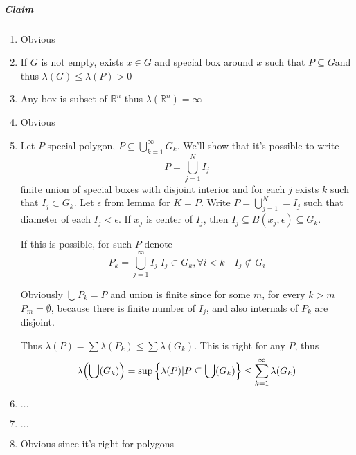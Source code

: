 \subparagraph{Claim}
\begin{enumerate}
	\item Obvious
	\item If $G$ is not empty, exists $x\in G$ and special box around $x$ such that $P\subseteq G$and thus $\lambda(G) \leq \lambda(P) > 0$
	\item Any box is subset of $\mathbb{R}^n$ thus $\lambda(\mathbb{R}^n) = \infty$
	\item Obvious
	\item Let $P$ special polygon, $P\subseteq \bigcup_{k=1}^\infty G_k$. We'll show that it's possible to write 
	$$P = \bigcup_{j=1}^N I_j$$
	finite union of special boxes with disjoint interior and for each $j$ exists $k$ such that $I_j \subset G_k$. Let $\epsilon$ from lemma for $K=P$. Write $P=\bigcup_{j=1}^N = I_j$ such that diameter of each $I_j<\epsilon$. If $x_j$ is center of $I_j$, then $I_j \subseteq B(x_j,\epsilon) \subseteq G_k$.
	
	If this is possible, for such $P$ denote $$P_k =  \bigcup_{j=1}^\infty I_j | I_j \subset G_k, \forall i<k \quad I_j \not\subset G_i$$
	
	Obviously $\bigcup P_k = P$ and union is finite since for some $m$, for every $k>m$ $P_m=\emptyset$, because there is finite number of $I_j$, and also internals of $P_k$ are disjoint.
	
	Thus $\lambda(P)=\sum \lambda(P_k)\leq\sum \lambda(G_k)$.
	This is right for any $P$, thus
	$$ \lambda\qty(\bigcup (G_k)) = \sup \left\{ \lambda(P) | P\subseteq \bigcup (G_k) \right\} \leq \sum_{k=1}^\infty \lambda(G_k)$$
	\item $\dots$
	\item $\dots$
	\item Obvious since it's right for polygons
\end{enumerate}